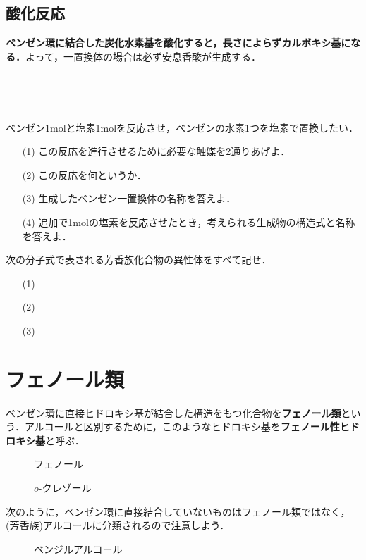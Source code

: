 \documentclass[a4paper,12pt]{ltjsreport}
\begin{document}
\subsection{酸化反応}
{\color{red}\textbf{ベンゼン環に結合した炭化水素基を酸化すると，長さによらずカルボキシ基になる．}}よって，一置換体の場合は必ず安息香酸が生成する．
\\[5pt]
  \centerline{~\ce{ -> }}\\[5pt]
  \begin{que}
    ベンゼン1molと塩素1molを反応させ，ベンゼンの水素1つを塩素で置換したい．
    \begin{itemize}
        \item [(1)]この反応を進行させるために必要な触媒を2通りあげよ．
        \item [(2)]この反応を何というか．
        \item [(3)]生成したベンゼン一置換体の名称を答えよ．
        \item [(4)]追加で1molの塩素を反応させたとき，考えられる生成物の構造式と名称を答えよ．
  \end{itemize}
    \end{que}
  \ans
  \newpage
  \begin{que}
   次の分子式で表される芳香族化合物の異性体をすべて記せ．
   \begin{itemize}
    \item [(1)]
    \item [(2)]
    \item [(3)]
   \end{itemize}
  \end{que}
  \ans
  \newpage
  \section{フェノール類}
  ベンゼン環に直接ヒドロキシ基が結合した構造をもつ化合物を{\color{red}\textbf{フェノール類}}という．アルコールと区別するために，このようなヒドロキシ基を{\color{red}\textbf{フェノール性ヒドロキシ基}}と呼ぶ．\\
  \begin{minipage}{0.5\linewidth}
\begin{figure}[H]
    \centering
       \caption{フェノール}
\end{figure}
\end{minipage}
\begin{minipage}{0.5\linewidth}
\begin{figure}[H]
    \centering
            \caption{$o$-クレゾール}
\end{figure}
\end{minipage}
次のように，ベンゼン環に直接結合していないものはフェノール類ではなく，(芳香族)アルコールに分類されるので注意しよう．
\begin{figure}[H]
    \centering
       \caption{ベンジルアルコール}
\end{figure}
\end{document}

